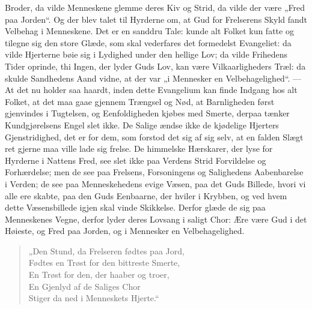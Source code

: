 \documentclass[12pt,a4paper]{book}
\begin{document}
Broder, da vilde Menneskene glemme deres Kiv og Strid, da vilde der være „Fred
paa Jorden“. Og der blev talet til Hyrderne om, at Gud
for Frelserens Skyld fandt Velbehag i Menneskene. Det er en sanddru Tale: kunde
alt Folket kun fatte og tilegne sig den store Glæde, som skal vederfares det
formedelst Evangeliet: da vilde Hjerterne bøie sig i Lydighed under den hellige
Lov;
da vilde Frihedens Tider oprinde, thi Ingen, der lyder Guds Lov, kan
være Vilkaarligheders Træl: da skulde Sandhedens Aand
vidne, at der var „i Mennesker en Velbehagelighed“. --- At det nu holder saa
haardt, inden dette Evangelium kan finde Indgang hos alt Folket, at det maa gaae
gjennem Trængsel og Nød, at Barnligheden først gjenvindes i Tugtelsen, og
Eenfoldigheden kjøbes med Smerte, derpaa tænker Kundgjørelsens Engel slet ikke.
De Salige ændse ikke de kjødelige Hjerters Gjenstridighed, det er for dem, som
forstod det sig af sig selv, at en falden Slægt ret gjerne maa ville lade sig
frelse. De himmelske Hærskarer, der lyse for Hyrderne i Nattens Fred, see slet
ikke paa Verdens Strid Forvildelse og Forhærdelse; men de see paa Frelsens,
Forsoningens og Salighedens Aabenbarelse i Verden; de see paa Menneskehedens
evige Væsen, paa det Guds Billede, hvori vi alle ere skabte, paa den Guds
Eenbaarne, der hviler i Krybben, og ved hvem dette Væsensbillede igjen skal vinde
Skikkelse. Derfor glæde de sig paa Menneskenes Vegne, derfor lyder deres Lovsang
i saligt Chor: {\large Ære være Gud i det Høieste, og Fred paa Jorden, og i
Mennesker en Velbehagelighed.}

\begingroup\small
\begin{verse}
„Den Stund, da Frelseren fødtes paa Jord,\\
Fødtes en Trøst for den bittreste Smerte,\\
En Trøst for den, der haaber og troer,\\
En Gjenlyd af de Saliges Chor\\
Stiger da ned i Menneskets Hjerte.“
\end{verse}
\endgroup
\end{document}
